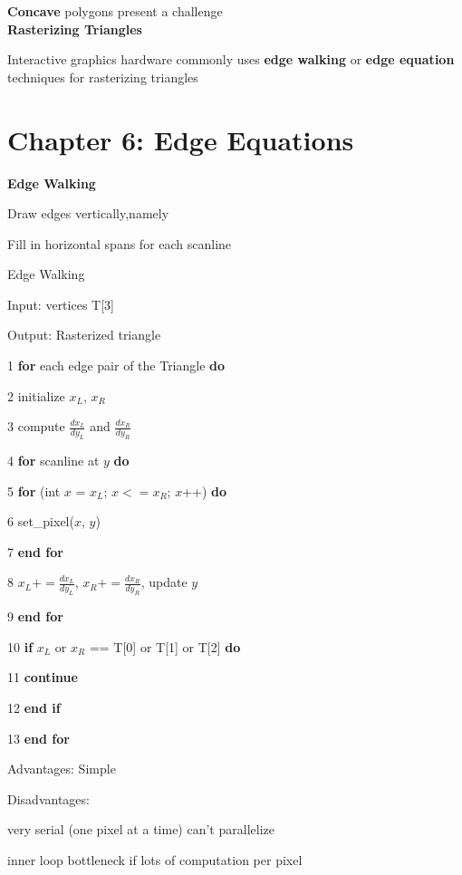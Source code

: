 \documentclass[]{report}
\begin{document}
\textbf{Concave} polygons present
a challenge\\
\textbf{Rasterizing Triangles}

Interactive graphics hardware commonly uses
\textbf{edge walking} or \textbf{edge equation} techniques for
rasterizing triangles\\


\section*{Chapter 6: Edge Equations}
\textbf{Edge Walking}

Draw edges vertically,namely

Fill in horizontal spans for each
scanline\\

\begin{algorithm}[h]
	\caption{Edge Walking}
	\begin{algorithmic}[1]
		\item[Input:] vertices T[3]
		\item[Output:] Rasterized triangle
		\item[1] \textbf{for} each edge pair of the Triangle \textbf{do}
		\item[2] initialize $x_L$, $x_R$
		\item[3] compute $\frac{dx_L}{dy_L}$ and $\frac{dx_R}{dy_R}$
		\item[4] \textbf{for} scanline at $y$ \textbf{do}
		\item[5] \textbf{for} (int $x$ = $x_L$; $x <= x_R$; $x$++) \textbf{do}
		\item[6] set\_pixel($x$, $y$)
		\item[7] \textbf{end for}
		\item[8] $x_L += \frac{dx_L}{dy_L}$, $x_R += \frac{dx_R}{dy_R}$, update $y$
		\item[9] \textbf{end for}
		\item[10] \textbf{if} $x_L$ or $x_R$ == T[0] or T[1] or T[2] \textbf{do}
		\item[11] \textbf{continue}
		\item[12] \textbf{end if}
		\item[13] \textbf{end for}
	\end{algorithmic}
\end{algorithm}
Advantages: Simple

Disadvantages: 

very serial (one pixel at a time) can’t parallelize

inner loop bottleneck if lots of computation per pixel
\end{document}
